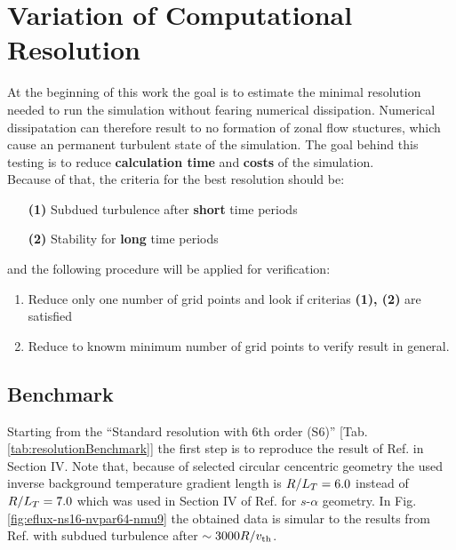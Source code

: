 \section{Variation of Computational Resolution}
\label{sec:variationsofresolution}

At the beginning of this work the goal is to estimate the minimal resolution needed to run the simulation without fearing numerical dissipation. Numerical dissipatation can therefore result to no formation of zonal flow stuctures, which cause an permanent turbulent state of the simulation. The goal behind this testing is to reduce \textbf{calculation time} and \textbf{costs} of the simulation. \\
Because of that, the criteria for the best resolution should be:
\begin{enumerate}
	\item[\textbf{(1)}] Subdued turbulence after \textbf{short} time periods
	\item[\textbf{(2)}] Stability for \textbf{long} time periods 
\end{enumerate}
and the following procedure will be applied for verification:
\begin{enumerate}
	\item Reduce only one number of grid points and look if criterias \textbf{(1), (2)} are satisfied
	\item Reduce to knowm minimum number of grid points to verify result in general.
\end{enumerate}

\subsection{Benchmark}
\label{sub:benchmark}

Starting from the \enquote{Standard resolution with 6th order (S6)} [Tab. \ref{tab:resolutionBenchmark}] the first step is to reproduce the result of Ref.  in Section IV. Note that, because of selected circular cencentric geometry the used inverse background temperature gradient length is $R/L_T = 6.0$ instead of $R/L_T = 7.0$ which was used in Section IV of Ref.  for $s$-$\alpha$ geometry. In Fig. \ref{fig:eflux-ns16-nvpar64-nmu9} the obtained data is simular to the results from Ref.  with subdued turbulence after $\sim 3000 R/v_{\mathrm{th}}$. 


